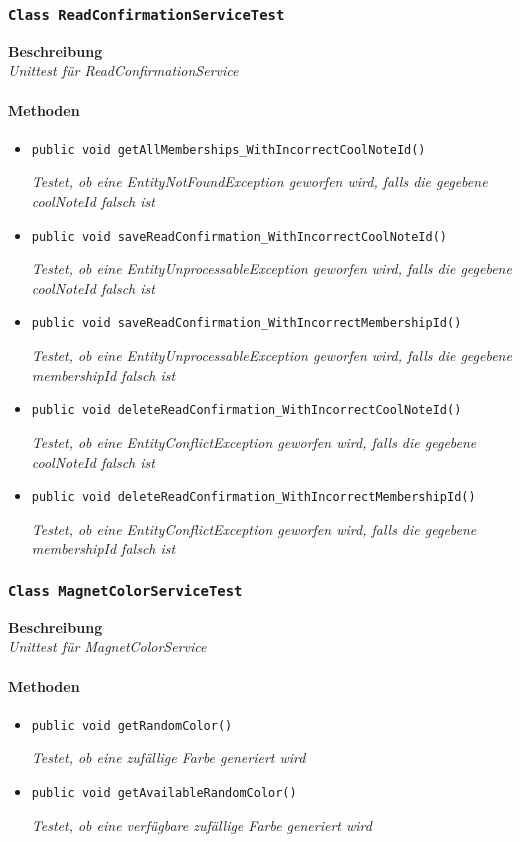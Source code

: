  \subsubsection{\texttt{Class ReadConfirmationServiceTest}}
 \textbf{Beschreibung} \\
 \textit{Unittest für ReadConfirmationService}
 \paragraph*{Methoden}
 \begin{itemize}
    	\item{\texttt{public void getAllMemberships\_WithIncorrectCoolNoteId()}}
    	
    	\textit{Testet, ob eine EntityNotFoundException geworfen wird, falls die gegebene coolNoteId falsch ist}
    	
    	\item{\texttt{public void saveReadConfirmation\_WithIncorrectCoolNoteId()}}
    	
    	\textit{Testet, ob eine EntityUnprocessableException geworfen wird, falls die gegebene coolNoteId falsch ist}
    	
    	\item{\texttt{public void saveReadConfirmation\_WithIncorrectMembershipId()}}
    	
    	\textit{Testet, ob eine EntityUnprocessableException geworfen wird, falls die gegebene membershipId falsch ist}
    	
    	\item{\texttt{public void deleteReadConfirmation\_WithIncorrectCoolNoteId()}}
    	
    	\textit{Testet, ob eine EntityConflictException geworfen wird, falls die gegebene coolNoteId falsch ist} 
    	
    	\item{\texttt{public void deleteReadConfirmation\_WithIncorrectMembershipId()}}
    	
    	\textit{Testet, ob eine EntityConflictException geworfen wird, falls die gegebene membershipId falsch ist}
 \end{itemize}

 \subsubsection{\texttt{Class MagnetColorServiceTest}}
 \textbf{Beschreibung} \\
 \textit{Unittest für MagnetColorService}
\paragraph*{Methoden}
\begin{itemize}
	\item{\texttt{public void getRandomColor()}}
	
	\textit{Testet, ob eine zufällige Farbe generiert wird}
	
	\item{\texttt{public void getAvailableRandomColor()}}
	
	\textit{Testet, ob eine verfügbare zufällige Farbe generiert wird}	
\end{itemize}

